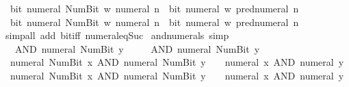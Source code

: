 \begin{isabellebody}
\ \ {\isacartoucheopen}bit\ {\isacharparenleft}{\kern0pt}numeral\ {\isacharparenleft}{\kern0pt}Num{\isachardot}{\kern0pt}Bit{}\ w{\isacharparenright}{\kern0pt}{\isacharparenright}{\kern0pt}\ {\isacharparenleft}{\kern0pt}numeral\ n{\isacharparenright}{\kern0pt}\ {\isasymlongleftrightarrow}\ bit\ {\isacharparenleft}{\kern0pt}numeral\ w{\isacharparenright}{\kern0pt}\ {\isacharparenleft}{\kern0pt}pred{\isacharunderscore}{\kern0pt}numeral\ n{\isacharparenright}{\kern0pt}{\isacartoucheclose}\isanewline
\ \ {\isacartoucheopen}bit\ {\isacharparenleft}{\kern0pt}numeral\ {\isacharparenleft}{\kern0pt}Num{\isachardot}{\kern0pt}Bit{}\ w{\isacharparenright}{\kern0pt}{\isacharparenright}{\kern0pt}\ {\isacharparenleft}{\kern0pt}numeral\ n{\isacharparenright}{\kern0pt}\ {\isasymlongleftrightarrow}\ bit\ {\isacharparenleft}{\kern0pt}numeral\ w{\isacharparenright}{\kern0pt}\ {\isacharparenleft}{\kern0pt}pred{\isacharunderscore}{\kern0pt}numeral\ n{\isacharparenright}{\kern0pt}{\isacartoucheclose}\isanewline
%
\isadelimproof
\ \ %
\endisadelimproof
%
\isatagproof
{}\isamarkupfalse%
\ {\isacharparenleft}{\kern0pt}simp{\isacharunderscore}{\kern0pt}all\ add{\isacharcolon}{\kern0pt}\ bit{\isacharunderscore}{\kern0pt}{}{\isacharunderscore}{\kern0pt}iff\ numeral{\isacharunderscore}{\kern0pt}eq{\isacharunderscore}{\kern0pt}Suc{\isacharparenright}{\kern0pt}%
\endisatagproof
{\isafoldproof}%
%
\isadelimproof
\isanewline
%
\endisadelimproof
\isanewline
{}\isamarkupfalse%
\ and{\isacharunderscore}{\kern0pt}numerals\ {\isacharbrackleft}{\kern0pt}simp{\isacharbrackright}{\kern0pt}{\isacharcolon}{\kern0pt}\isanewline
\ \ {\isacartoucheopen}{}\ AND\ numeral\ {\isacharparenleft}{\kern0pt}Num{\isachardot}{\kern0pt}Bit{}\ y{\isacharparenright}{\kern0pt}\ {\isacharequal}{\kern0pt}\ {}{\isacartoucheclose}\isanewline
\ \ {\isacartoucheopen}{}\ AND\ numeral\ {\isacharparenleft}{\kern0pt}Num{\isachardot}{\kern0pt}Bit{}\ y{\isacharparenright}{\kern0pt}\ {\isacharequal}{\kern0pt}\ {}{\isacartoucheclose}\isanewline
\ \ {\isacartoucheopen}numeral\ {\isacharparenleft}{\kern0pt}Num{\isachardot}{\kern0pt}Bit{}\ x{\isacharparenright}{\kern0pt}\ AND\ numeral\ {\isacharparenleft}{\kern0pt}Num{\isachardot}{\kern0pt}Bit{}\ y{\isacharparenright}{\kern0pt}\ {\isacharequal}{\kern0pt}\ {}\ {\isacharasterisk}{\kern0pt}\ {\isacharparenleft}{\kern0pt}numeral\ x\ AND\ numeral\ y{\isacharparenright}{\kern0pt}{\isacartoucheclose}\isanewline
\ \ {\isacartoucheopen}numeral\ {\isacharparenleft}{\kern0pt}Num{\isachardot}{\kern0pt}Bit{}\ x{\isacharparenright}{\kern0pt}\ AND\ numeral\ {\isacharparenleft}{\kern0pt}Num{\isachardot}{\kern0pt}Bit{}\ y{\isacharparenright}{\kern0pt}\ {\isacharequal}{\kern0pt}\ {}\ {\isacharasterisk}{\kern0pt}\ {\isacharparenleft}{\kern0pt}numeral\ x\ AND\ numeral\ y{\isacharparenright}{\kern0pt}{\isacartoucheclose}\isanewline

\end{isabellebody}
